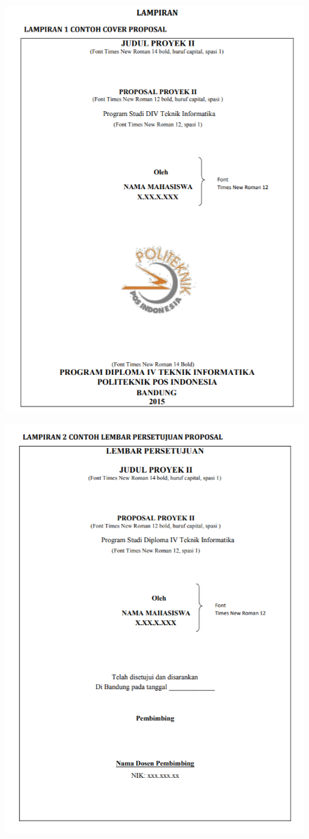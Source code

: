 \begin{figure}[H]
    \centering
    \includegraphics[scale=0.9]{figures/lap1.png}
    \label{alir}
\end{figure}

\begin{figure}[H]
    \centering
    \includegraphics[scale=0.9]{figures/lap2.png}
    \label{alir}
\end{figure}